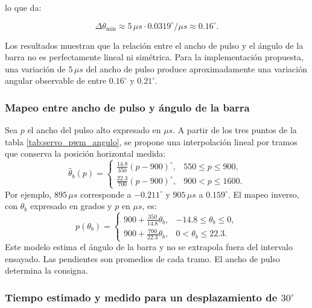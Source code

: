 \documentclass[a4paper, twoside, 10pt, spanish]{article}
\numberwithin{table}{section}
\begin{document}
lo que da:

\begin{equation*}
\Delta\theta_{\min}
\approx
5\,\mu s \cdot 0.0319^\circ/\mu s
\approx
0.16^\circ.
\end{equation*}

Los resultados muestran que la relación entre el ancho de pulso y el
ángulo de la barra no es perfectamente lineal ni simétrica. Para la
implementación propuesta, una variación de $5\,\mu s$ del ancho de pulso produce
aproximadamente una variación angular observable de entre
$0.16^\circ$ y $0.21^\circ$.

\subsubsection{Mapeo entre ancho de pulso y ángulo de la barra}

Sea $p$ el ancho del pulso alto expresado en $\mu s$. A partir de los tres
puntos de la tabla \ref{tab:servo_pwm_angulo}, se propone una interpolación
lineal por tramos que conserva la posición horizontal medida:
\begin{equation}
\hat\theta_b(p)=
\begin{cases}
\displaystyle \frac{14.8}{350}(p-900)^\circ, & 550\leq p\leq900,\\[4pt]
\displaystyle \frac{22.3}{700}(p-900)^\circ, & 900<p\leq1600.
\end{cases}
\label{eq:mapa_servo}
\end{equation}
Por ejemplo, $895\,\mu s$ corresponde a $-0.211^\circ$ y
$905\,\mu s$ a $0.159^\circ$. El mapeo inverso, con $\theta_b$ expresado
en grados y $p$ en $\mu s$, es:
\begin{equation}
p(\theta_b)=
\begin{cases}
900+\displaystyle\frac{350}{14.8}\theta_b, & -14.8\leq\theta_b\leq0,\\[4pt]
900+\displaystyle\frac{700}{22.3}\theta_b, & 0<\theta_b\leq22.3.
\end{cases}
\end{equation}
Este modelo estima el ángulo de la barra y no se extrapola fuera del intervalo ensayado. Las pendientes son promedios
de cada tramo. El ancho de pulso determina la
consigna.

\subsubsection{Tiempo estimado y medido para un desplazamiento de $30^\circ$}
\end{document}
